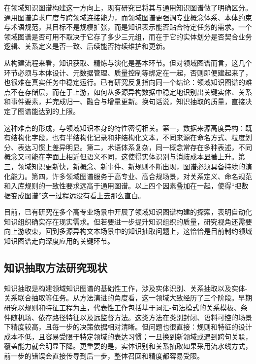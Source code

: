 在领域知识图谱构建这一方向上，现有研究已将其与通用知识图谱做了明确区分。通用图谱追求广度与跨领域连接能力，而领域图谱更强调专业概念体系、本体约束与术语规范，其目标不是规模扩张，而是知识表示能否贴合特定任务的需求\cite{AbuSalih2021DomainSpecificKGSurvey}。一个领域图谱是否可用不取决于它存了多少三元组，而在于它的实体划分是否契合业务逻辑、关系定义是否一致、后续能否持续维护和更新\cite{Hogan2021KnowledgeGraphs}。

从构建流程来看，知识获取、精炼与演化是基本环节\cite{Zhong2023AutomaticKGConstructionSurvey}。但对领域图谱而言，这几个环节必须与本体设计、元数据管理、质量控制等绑定在一起，否则即便建起来了，也很难在真实任务中稳定运行。已有研究反复指向同一个结论：领域知识图谱的难点不在存储层，而在于上游，如何从多源异构数据中稳定地识别出关键实体、关系和事件要素，并完成归一、融合与增量更新\cite{AbuSalih2021DomainSpecificKGSurvey,Zhong2023AutomaticKGConstructionSurvey}。换句话说，知识抽取的质量，直接决定了图谱能达到的上限。

这种难点的形成，与领域知识本身的特性密切相关。第一，数据来源高度异构：既有结构化字段，也有半结构化记录和非结构化文本，不同来源在命名方式、粒度划分、表达习惯上差异明显\cite{Sun2024Docs2KG}。第二，术语体系复杂，同一概念常存在多种表述，不同概念又可能在字面上相近但语义不同，这使得实体识别与消歧成本显著上升。第三，领域知识更新快，新概念、新事件、新规则不断出现，图谱必须具备持续的演化能力。第四，许多领域图谱服务于高专业、高合规场景，对关系定义、命名规范和入库规则的一致性要求远高于通用图谱。以上四个因素叠加在一起，使得“把数据变成图谱”这一过程远没有看上去那么直白。

目前，已有研究在多个高专业场景中开展了领域知识图谱构建的探索，表明自动化知识组织确实存在现实需求\cite{Sun2024Docs2KG,vanCauter2024OntologyGuidedKGC,Zhang2024EDC}。但若要进一步提升知识组织的质量，研究视角还需要向上游收束，回到多源异构文本场景中的知识抽取问题上，这恰恰是目前制约领域知识图谱走向深度应用的关键环节。

\subsection{知识抽取方法研究现状}

知识抽取是构建领域知识图谱的基础性工作，涉及实体识别、关系抽取以及实体-关系联合抽取等任务。从方法演进的角度看，这一领域大致经历了三个阶段。早期研究以规则和特征工程为主，代表性工作包括基于词汇-句法模式的关系模板、条件随机场、依存路径特征以及远监督方法\cite{Hearst1992Hyponyms,Lafferty2001CRF,Bunescu2005ShortestPathKernel,Mintz2009DistantSupervision}。这类方法在类别封闭、语料可控的场景下精度较高，且每一步的决策依据相对清晰。但问题也很直接：规则和特征的设计成本不低，且容易受限于特定领域的表达习惯；一旦换到新领域或遇到跨句关联，覆盖能力就会明显下降。更重要的是，实体识别和关系抽取如果采用流水线方式，前一步的错误会直接传导到后一步，整体召回和精度都容易受限。

